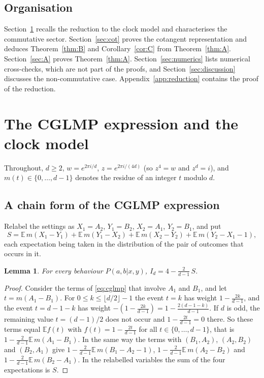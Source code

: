 \documentclass[11pt]{amsart}
\newtheorem{lemma}[theorem]{Lemma}
\theoremstyle{definition}
\theoremstyle{remark}
\begin{document}
\subsection{Organisation}
Section~\ref{sec:model} recalls the reduction to the clock model and characterises the commutative sector.
Section~\ref{sec:cot} proves the cotangent representation and deduces Theorem~\ref{thm:B} and
Corollary~\ref{cor:C} from Theorem~\ref{thm:A}. Section~\ref{sec:A} proves Theorem~\ref{thm:A}.
Section~\ref{sec:numerics} lists numerical cross-checks, which are not part of the proofs, and
Section~\ref{sec:discussion} discusses the non-commutative case. Appendix~\ref{app:reduction} contains the proof
of the reduction.

\section{The CGLMP expression and the clock model}\label{sec:model}

Throughout, $d\ge2$, $w=e^{2\pi i/d}$, $z=e^{2\pi i/(4d)}$ (so $z^4=w$ and $z^d=i$), and $m(t)\in\{0,\dots,d-1\}$
denotes the residue of an integer $t$ modulo $d$.

\subsection{A chain form of the CGLMP expression}
Relabel the settings as $X_1=A_2$, $Y_1=B_2$, $X_2=A_1$, $Y_2=B_1$, and put
\begin{equation}\label{eq:S}
S=\mathbb{E}\,m(X_1-Y_1)+\mathbb{E}\,m(Y_1-X_2)+\mathbb{E}\,m(X_2-Y_2)+\mathbb{E}\,m(Y_2-X_1-1),
\end{equation}
each expectation being taken in the distribution of the pair of outcomes that occurs in it.

\begin{lemma}\label{lem:chain}
For every behaviour $P(a,b|x,y)$, $I_d=4-\frac{2}{d-1}\,S$.
\end{lemma}

\begin{proof}
Consider the terms of \eqref{eq:cglmp} that involve $A_1$ and $B_1$, and let $t=m(A_1-B_1)$. For
$0\le k\le\lfloor d/2\rfloor-1$ the event $t=k$ has weight $1-\frac{2k}{d-1}$, and the event $t=d-1-k$ has weight
$-(1-\frac{2k}{d-1})=1-\frac{2(d-1-k)}{d-1}$. If $d$ is odd, the remaining value $t=(d-1)/2$ does not occur and
$1-\frac{2t}{d-1}=0$ there. So these terms equal $\mathbb{E}f(t)$ with $f(t)=1-\frac{2t}{d-1}$ for all
$t\in\{0,\dots,d-1\}$, that is $1-\frac{2}{d-1}\mathbb{E}\,m(A_1-B_1)$. In the same way the terms with $(B_1,A_2)$,
$(A_2,B_2)$ and $(B_2,A_1)$ give $1-\frac2{d-1}\mathbb{E}\,m(B_1-A_2-1)$, $1-\frac2{d-1}\mathbb{E}\,m(A_2-B_2)$ and
$1-\frac2{d-1}\mathbb{E}\,m(B_2-A_1)$. In the relabelled variables the sum of the four expectations is $S$.
\end{proof}
\end{document}
